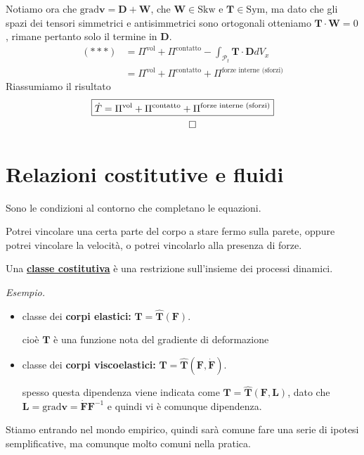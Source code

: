 \documentclass[10pt,a4paper,twoside]{book}
\begin{document}
Notiamo ora che $\mathrm{grad}\mathbf{v} =\mathbf{D} +\mathbf{W}$, che $\mathbf{W} \in \mathrm{Skw}$ e $\mathbf{T} \in \mathrm{Sym}$, ma dato che gli spazi dei tensori simmetrici e antisimmetrici sono ortogonali otteniamo $\mathbf{T} \cdotp \mathbf{W} =0$, rimane pertanto solo il termine in $\mathbf{D}$.
\begin{align*}
( ***) & =\Pi ^{\text{vol}} +\Pi ^{\text{contatto}} -\int _{\mathcal{P}_{t}}\mathbf{T} \cdotp \mathbf{D} dV_{x}\\
 & =\Pi ^{\text{vol}} +\Pi ^{\text{contatto}} +\Pi ^{\text{forze interne (sforzi)}}
\end{align*}
Riassumiamo il risultato
\begin{gather*}
\boxed{\dot{T} =\Pi ^{\text{vol}} +\Pi ^{\text{contatto}} +\Pi ^{\text{forze interne (sforzi)}}}\\
\qed 
\end{gather*}
\chapter{Relazioni costitutive e fluidi}

Sono le condizioni al contorno che completano le equazioni.

Potrei vincolare una certa parte del corpo a stare fermo sulla parete, oppure potrei vincolare la velocità, o potrei vincolarlo alla presenza di forze.

Una \underline{\textbf{classe costitutiva}} è una restrizione sull'insieme dei processi dinamici.



\textit{Esempio.}
\begin{itemize}
\item classe dei \textbf{corpi elastici:} $\mathbf{T} =\hat{\mathbf{T}}(\mathbf{F})$.

cioè $\mathbf{T}$ è una funzione nota del gradiente di deformazione
\item classe dei \textbf{corpi viscoelastici:} $\mathbf{T} =\hat{\mathbf{T}}(\mathbf{F} ,\dot{\mathbf{F}})$.

spesso questa dipendenza viene indicata come $\mathbf{T} =\hat{\mathbf{T}}(\mathbf{F} ,\mathbf{L})$, dato che $\mathbf{L} =\mathrm{grad}\mathbf{v} =\dot{\mathbf{F}}\mathbf{F}^{-1}$ e quindi vi è comunque dipendenza.
\end{itemize}



Stiamo entrando nel mondo empirico, quindi sarà comune fare una serie di ipotesi semplificative, ma comunque molto comuni nella pratica.
\end{document}
